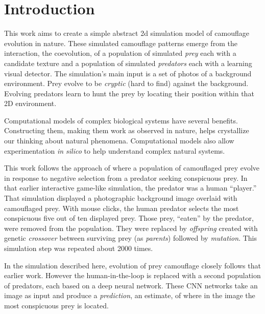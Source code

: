 \documentclass[letterpaper]{article}
\newcommand{\jargon}[1]{\textit{#1}}
\begin{document}
\section{Introduction}
This work aims to create a simple abstract 2d simulation model of camouflage evolution in nature. These simulated camouflage patterns emerge from the interaction, the coevolution, of a population of simulated \jargon{prey} each with a candidate texture and a population of simulated \jargon{predators} each with a learning visual detector. The simulation's main input is a set of photos of a background environment. Prey evolve to be \jargon{cryptic} (hard to find) against the background. Evolving predators learn to hunt the prey by locating their position within that 2D environment.
\par
Computational models of complex biological systems have several benefits. Constructing them, making them work as observed in nature, helps crystallize our thinking about natural phenomena. Computational models also allow experimentation \textit{in silico} to help understand complex natural systems.
\par
This work follows the approach of \citet{reynolds_iec_2011} where a population of camouflaged prey evolve in response to negative selection from a predator seeking conspicuous prey. In that earlier interactive game-like simulation, the predator was a human “player.” That simulation displayed a photographic background image overlaid with camouflaged prey. With mouse clicks, the human predator selects the most conspicuous five out of ten displayed prey. Those prey, “eaten” by the predator, were removed from the population.  They were replaced by \jargon{offspring} created with genetic \jargon{crossover} between surviving prey (as \jargon{parents}) followed by \jargon{mutation}. This simulation step was repeated about 2000 times.
\par
In the simulation described here, evolution of prey camouflage closely follows that earlier work. However the human-in-the-loop is replaced with a second population of predators, each based on a deep neural network. These CNN networks take an image as input and produce a \jargon{prediction}, an estimate, of where in the image the most conspicuous prey is located.
\par
\end{document}
